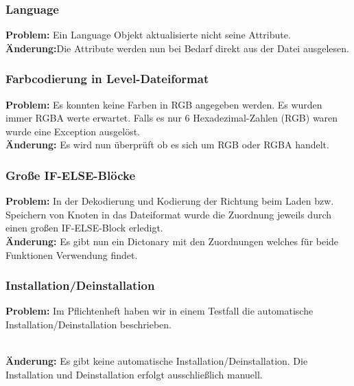 \subsubsection*{Language}
\textbf{Problem:}
Ein Language Objekt aktualisierte nicht seine Attribute.
\\
\textbf{Änderung:}Die Attribute werden nun bei Bedarf direkt aus der Datei ausgelesen.

\subsubsection*{Farbcodierung in Level-Dateiformat}
\textbf{Problem:}
Es konnten keine Farben in RGB angegeben werden. Es wurden immer RGBA werte erwartet.
Falls es nur 6 Hexadezimal-Zahlen (RGB) waren wurde eine Exception ausgelöst.
\\
\textbf{Änderung:} Es wird nun überprüft ob es sich um RGB oder RGBA handelt.

\subsubsection*{Große IF-ELSE-Blöcke}
\textbf{Problem:}
In der Dekodierung und Kodierung der Richtung beim Laden bzw. Speichern von Knoten in das Dateiformat wurde die Zuordnung jeweils durch einen großen IF-ELSE-Block erledigt.
\\
\textbf{Änderung:} Es gibt nun ein Dictonary mit den Zuordnungen welches für beide Funktionen Verwendung findet.


\subsubsection*{Installation/Deinstallation}
\textbf{Problem:} Im Pflichtenheft haben wir in einem Testfall die automatische Installation/Deinstallation beschrieben.

\\
\textbf{Änderung:} Es gibt keine automatische Installation/Deinstallation. Die Installation und Deinstallation erfolgt ausschließlich manuell.






